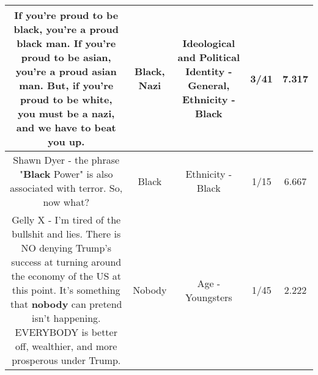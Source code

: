 \documentclass[11pt]{article}
\newlength\mylength
\begin{document}
\begin{center}
\begin{longtable}{|C{.65\mylength}|C{.30\mylength}|C{.12\mylength}|C{.12\mylength}|C{.12\mylength}|}
  \small If you're proud to be \textbf{black}, you're a proud \textbf{black} man.  If you're proud to be asian, you're a proud asian man.  But, if you're proud to be white, you must be a \textbf{nazi}, and we have to beat you up.\normalsize   & Black, Nazi &  Ideological and Political Identity - General, Ethnicity - Black & 3/41 & 7.317 \\  \hline
  \small Shawn Dyer - the phrase "\textbf{Black} Power" is also associated with terror.  So, now what?\normalsize   & Black & Ethnicity - Black & 1/15 & 6.667 \\  \hline
  \small Gelly X - I'm tired of the bullshit and lies.  There is NO denying Trump's success at turning around the economy of the US at this point.  It's something that \textbf{nobody} can pretend isn't happening.  EVERYBODY is better off, wealthier, and more prosperous under Trump.\normalsize   & Nobody & Age - Youngsters & 1/45 & 2.222 \\  \hline

\end{longtable}
\end{center}
\end{document}
